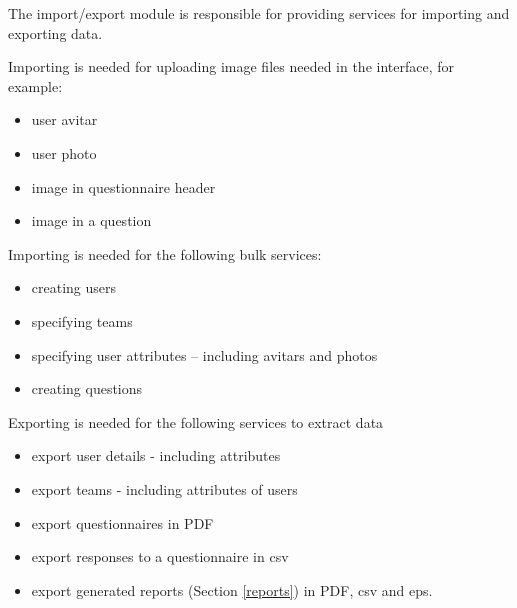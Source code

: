 The import/export module is responsible for providing services for importing and exporting data. 

Importing is needed for uploading image files needed in the interface, for example:
\begin{itemize}
\item user avitar
\item user photo
\item image in questionnaire header
\item image in a question
\end{itemize}

Importing is needed for the following bulk services:
\begin{itemize}
\item creating users
\item specifying teams
\item specifying user attributes -- including avitars and photos
\item creating questions
\end{itemize}

Exporting is needed for the following services to extract data
\begin{itemize}
\item export user details - including attributes
\item export teams - including attributes of users
\item export questionnaires in PDF
\item export responses to a questionnaire in csv
\item export generated reports (Section \ref{reports}) in PDF, csv and eps.
\end{itemize}
